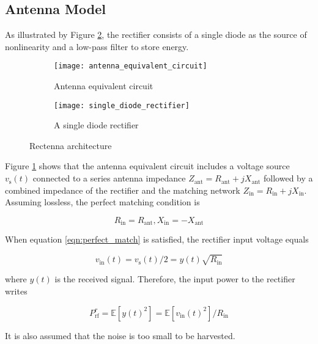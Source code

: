 \subsection{Antenna Model}\label{sec:antenna-model}

As illustrated by Figure \ref{fig:single_diode_rectifier}, the rectifier consists of a single diode as the source of nonlinearity and a low-pass filter to store energy.

\begin{figure}
  \centering

  \begin{subfigure}{.45\textwidth}
    \centering
      \texttt{[image: antenna\_equivalent\_circuit]}
    \caption{Antenna equivalent circuit}
    \label{fig:antenna_equivalent_circuit}
  \end{subfigure}
  \begin{subfigure}{.45\textwidth}
    \centering
      \texttt{[image: single\_diode\_rectifier]}
    \caption{A single diode rectifier}
    \label{fig:single_diode_rectifier}
  \end{subfigure}

  \caption{Rectenna architecture}
  \label{fig:rectenna_architecture}
\end{figure}

Figure \ref{fig:antenna_equivalent_circuit} shows that the antenna equivalent circuit includes a voltage source ${v_{\text{s}}}(t)$ connected to a series antenna impedance ${Z_{{\text{ant}}}} = {R_{{\text{ant}}}} + j{X_{{\text{ant}}}}$ followed by a combined impedance of the rectifier and the matching network ${Z_{{\text{in}}}} = {R_{{\text{in}}}} + j{X_{{\text{in}}}}$. Assuming lossless, the perfect matching condition is

\begin{equation}\label{eqn:perfect_match}
  {R_{{\text{in}}}} = {R_{{\text{ant}}}},{X_{{\text{in}}}} =  - {X_{{\text{ant}}}}
\end{equation}

When equation \ref{eqn:perfect_match} is satisfied, the rectifier input voltage equals

\begin{equation}\label{eqn:rectifier_input_voltage}
  {v_{{\text{in}}}}(t) = {v_{\text{s}}}(t)/2 = y(t)\sqrt {{R_{{\text{in}}}}}
\end{equation}

where ${y(t)}$ is the received signal. Therefore, the input power to the rectifier writes

\begin{equation}\label{eqn:rectifier_input_power}
  P_{{\text{rf}}}^r = \mathbb{E}\left[ {y{{(t)}^2}} \right] = \mathbb{E}\left[ {{v_{{\text{in}}}}{{(t)}^2}} \right]/{R_{{\text{in}}}}
\end{equation}

It is also assumed that the noise is too small to be harvested.

